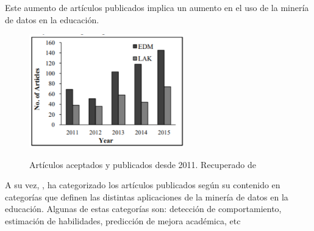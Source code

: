 Este aumento de artículos publicados implica un aumento en el uso de la minería de datos en la educación.

\begin{figure}[htb]
	\centering
	\caption{Artículos aceptados y publicados desde 2011. Recuperado de \protect{}}
	\includegraphics[width=0.6\textwidth]{recursos/artPublicados}
	\label{fig:artPublicados}
\end{figure}
\FloatBarrier

A su vez, , ha categorizado los artículos publicados según su contenido en categorías que definen las distintas aplicaciones de la minería de datos en la educación. Algunas de estas categorías son: detección de comportamiento, estimación de habilidades, predicción de mejora académica, etc


